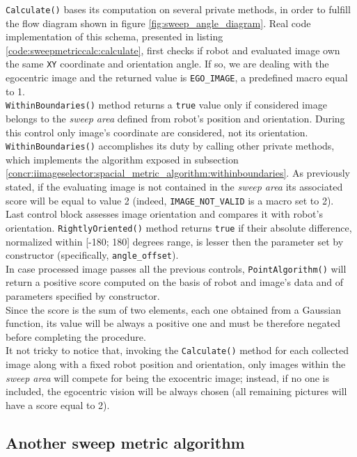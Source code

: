 \texttt{Calculate()} bases its computation on several private
methods, in order to fulfill the flow diagram shown in
figure \ref{fig:sweep_angle_diagram}. Real code implementation
of this schema, presented in listing
\ref{code:sweepmetriccalc:calculate}, first checks if robot
and evaluated image own the same \texttt{XY} coordinate and orientation
angle. If so, we are dealing with the egocentric image and
the returned value is \texttt{EGO\_IMAGE}, a predefined macro
equal to 1.
\\
\texttt{WithinBoundaries()} method returns a \texttt{true}
value only if considered image belongs to the \textit{sweep
area} defined from robot's position and orientation. During
this control only image's coordinate are considered, not its
orientation.
\\
\texttt{WithinBoundaries()}
accomplishes its duty by calling other private methods, which
implements the algorithm exposed in subsection
\ref{concr:iimageselector:spacial_metric_algorithm:withinboundaries}.
As previously stated, if the evaluating image is not contained
in the \textit{sweep area} its associated score will be equal
to value 2 (indeed, \texttt{IMAGE\_NOT\_VALID} is a macro
set to 2).
\\
Last control block assesses image orientation and compares it
with robot's orientation. \texttt{RightlyOriented()} method
returns \texttt{true} if their absolute difference, normalized
within [-180; 180] degrees range, is lesser then the parameter
set by constructor (specifically, \texttt{angle\_offset}).
\\
In case processed image passes all the previous controls,
\texttt{PointAlgorithm()} will return a positive score computed
on the basis of robot and image's data and
of parameters specified by constructor.
\\
Since the score is the sum of two elements, each one obtained
from a Gaussian function, its value will be always a
positive one and must be therefore 
negated before completing the procedure.
\\
It not tricky to notice that, invoking the \texttt{Calculate()}
method for each collected image along with a fixed robot
position and orientation, only images within the \textit{sweep
area} will compete for being the exocentric image; instead, if no
one is included, the egocentric vision will be always chosen
(all remaining pictures will have a score equal to 2).

\subsection{Another sweep metric algorithm}
\label{concr:iimageselector:another_sweep_metric_algorithm}

